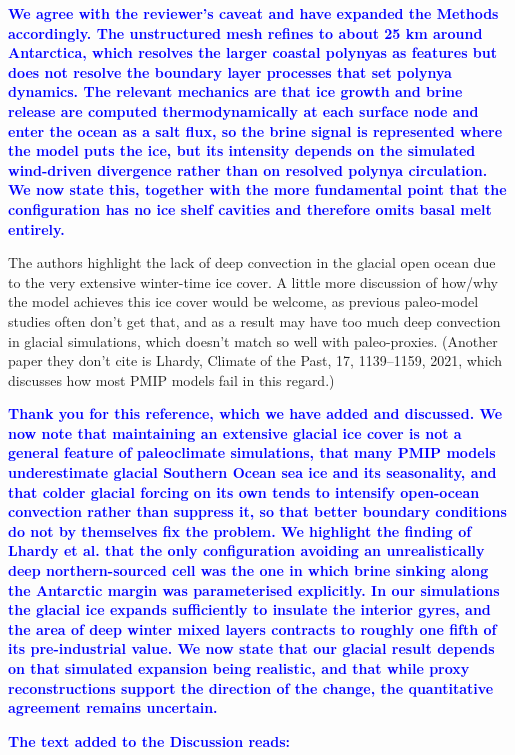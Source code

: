 \documentclass[pdflatex,sn-nature]{sn-jnl}
\begin{document}
\noindent\textcolor{blue}{\textbf{We agree with the reviewer's caveat and have expanded the Methods accordingly. The unstructured mesh refines to about 25 km around Antarctica, which resolves the larger coastal polynyas as features but does not resolve the boundary layer processes that set polynya dynamics. The relevant mechanics are that ice growth and brine release are computed thermodynamically at each surface node and enter the ocean as a salt flux, so the brine signal is represented where the model puts the ice, but its intensity depends on the simulated wind-driven divergence rather than on resolved polynya circulation. We now state this, together with the more fundamental point that the configuration has no ice shelf cavities and therefore omits basal melt entirely.}}


\medskip
\noindent The authors highlight the lack of deep convection in the glacial open ocean due to the very extensive winter-time ice cover. A little more discussion of how/why the model achieves this ice cover would be welcome, as previous paleo-model studies often don't get that, and as a result may have too much deep convection in glacial simulations, which doesn't match so well with paleo-proxies. (Another paper they don't cite is Lhardy, Climate of the Past, 17, 1139--1159, 2021, which discusses how most PMIP models fail in this regard.)
\medskip

\noindent\textcolor{blue}{\textbf{Thank you for this reference, which we have added and discussed. We now note that maintaining an extensive glacial ice cover is not a general feature of paleoclimate simulations, that many PMIP models underestimate glacial Southern Ocean sea ice and its seasonality, and that colder glacial forcing on its own tends to intensify open-ocean convection rather than suppress it, so that better boundary conditions do not by themselves fix the problem. We highlight the finding of Lhardy et al. that the only configuration avoiding an unrealistically deep northern-sourced cell was the one in which brine sinking along the Antarctic margin was parameterised explicitly. In our simulations the glacial ice expands sufficiently to insulate the interior gyres, and the area of deep winter mixed layers contracts to roughly one fifth of its pre-industrial value. We now state that our glacial result depends on that simulated expansion being realistic, and that while proxy reconstructions support the direction of the change, the quantitative agreement remains uncertain.}}


\noindent\textcolor{blue}{\textbf{The text added to the Discussion reads:}}
\end{document}
